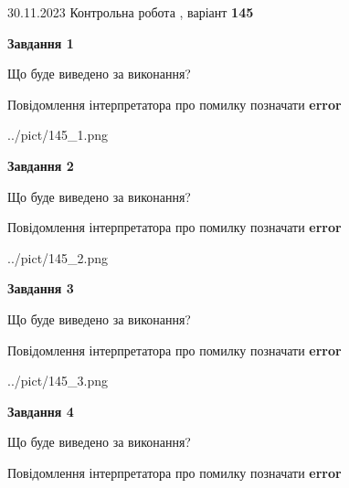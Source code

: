 \documentclass[12pt, ukrainian]{article}
\begin{document}
{{30.11.2023 Контрольна робота , варіант  \No \textbf { 145 }\par}}
{




{\begin {center}\textbf{Завдання 1}\end {center}}\par
Що буде виведено за виконання? \par
Повідомлення інтерпретатора про помилку позначати \textbf{error}

\begin{center}
	{../pict/145_1.png}
\end{center}
\newpage

{\begin {center}\textbf{Завдання 2}\end {center}}\par
Що буде виведено за виконання? \par
Повідомлення інтерпретатора про помилку позначати \textbf{error}

\begin{center}
	{../pict/145_2.png}
\end{center}
\newpage

{\begin {center}\textbf{Завдання 3}\end {center}}\par
Що буде виведено за виконання? \par
Повідомлення інтерпретатора про помилку позначати \textbf{error}

\begin{center}
	{../pict/145_3.png}
\end{center}
\newpage

{\begin {center}\textbf{Завдання 4}\end {center}}\par
Що буде виведено за виконання? \par
Повідомлення інтерпретатора про помилку позначати \textbf{error}

}
\end{document}
